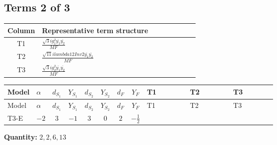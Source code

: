 \documentclass[8pt]{article}
\begin{document}
\begin{landscape}
\subsection*{Terms 2 of 3}
\begin{center}
\begin{tabular}{@{}c >{\raggedright\arraybackslash}p{0.82\linewidth}@{}}
\toprule
Column & Representative term structure \\
\midrule
T1 & \(\displaystyle \frac{\sqrt{3} i g_{1}^{2} \overline{y_{1}} \overline{y_{2}}}{MF}\) \\
\midrule
T2 & \(\displaystyle \frac{\sqrt{11} i lambda12Inv2 \overline{y_{1}} \overline{y_{2}}}{MF}\) \\
\midrule
T3 & \(\displaystyle \frac{\sqrt{3} i g_{2}^{2} \overline{y_{1}} \overline{y_{2}}}{MF}\) \\
\midrule
\bottomrule
\end{tabular}
\end{center}
\smallskip
\tiny
\begin{longtable}{@{}llcccccc >{\raggedright\arraybackslash}p{0.21\linewidth} >{\raggedright\arraybackslash}p{0.21\linewidth} >{\raggedright\arraybackslash}p{0.21\linewidth}@{}}
\toprule
Model & $\alpha$ & $d_{S_1}$ & $Y_{S_1}$ & $d_{S_2}$ & $Y_{S_2}$ & $d_F$ & $Y_F$ & T1 & T2 & T3 \\
\midrule
\endfirsthead
\toprule
Model & $\alpha$ & $d_{S_1}$ & $Y_{S_1}$ & $d_{S_2}$ & $Y_{S_2}$ & $d_F$ & $Y_F$ & T1 & T2 & T3 \\
\midrule
\endhead
T3-E & $-2$ & $3$ & $-1$ & $3$ & $0$ & $2$ & $-\frac{1}{2}$ & \scriptsize\adjustbox{max width=\linewidth}{$\begin{gathered} \frac{\sqrt{3} i g_{1}^{2} \overline{y_{1}} \overline{y_{2}}}{8 MF}\end{gathered}$} & \scriptsize\adjustbox{max width=\linewidth}{$\begin{gathered} \frac{3 \sqrt{11} i lambda12Inv2 \overline{y_{1}} \overline{y_{2}}}{22 MF}\end{gathered}$} & \scriptsize\adjustbox{max width=\linewidth}{$\begin{gathered} \frac{49 \sqrt{3} i g_{2}^{2} \overline{y_{1}} \overline{y_{2}}}{24 MF}\end{gathered}$} \\
\midrule
\bottomrule
\end{longtable}
\clearpage
\noindent\textbf{Quantity: }$\mathrm{2,2,6,13}$\par\smallskip

\end{landscape}
\end{document}
